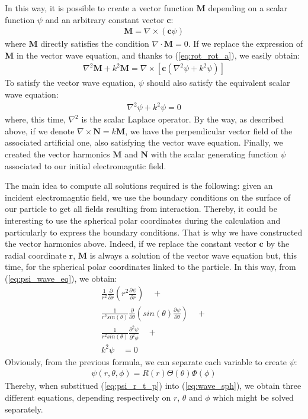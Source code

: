 \documentclass{article}
\begin{document}
In this way, it is possible to create a vector function $\textbf{M}$ depending on a scalar function $\psi$ and an arbitrary constant vector $\textbf{c}$:
\begin{align}
\textbf{M} = \nabla \times (\textbf{c}\psi)
\end{align}
where \textbf{M} directly satisfies the condition $\nabla \cdot \textbf{M} = 0$. If we replace the expression of \textbf{M} in the vector wave equation, and thanks to (\ref{eq:rot_rot_a}), we easily obtain:
\begin{align}
\nabla ^{2} \textbf{M} + k^{2}\textbf{M} = \nabla \times [\textbf{c}(\nabla ^{2} \psi + k^{2}\psi)]
\end{align}
To satisfy the vector wave equation, $\psi$ should also satisfy the equivalent scalar wave equation:
\begin{align}\label{eq:psi_wave_eq}
\nabla ^{2} \psi + k^{2}\psi = 0
\end{align}
where, this time, $\nabla ^{2}$ is the scalar Laplace operator. By the way, as described above, if we denote $\nabla \times \textbf{N} = k \textbf{M}$, we have the perpendicular vector field of the associated artificial one, also satisfying the vector wave equation. Finally, we created the vector harmonics $\textbf{M}$ and $\textbf{N}$ with the scalar generating function $\psi$ associated to our initial electromagntic field.

The main idea to compute all solutions required is the following: given an incident electromagntic field, we use the boundary conditions on the surface of our particle to get all fields resulting from interaction. Thereby, it could be interesting to use the spherical polar coordinates during the calculation and particularly to express the boundary conditions. That is why we have constructed the vector harmonics above. Indeed, if we replace the constant vector $\textbf{c}$ by the radial coordinate $\textbf{r}$, $\textbf{M}$ is always a solution of the vector wave equation but, this time, for the spherical polar coordinates linked to the particle. In this way, from (\ref{eq:psi_wave_eq}), we obtain:
\begin{equation}\label{eq:wave_sph}
\begin{aligned}
\frac{1}{r^{2}}\frac{\partial }{\partial r}(r^{2}\frac{\partial \psi}{\partial r}) \quad + \\ 
\frac{1}{r^{2}sin(\theta)}\frac{\partial }{\partial \theta}(sin(\theta)\frac{\partial \psi}{\partial \theta}) \quad + \\
\frac{1}{r^{2}sin(\theta)}\frac{\partial^{2} \psi}{\partial^{2} \phi} \quad + \\
k^{2}\psi \quad = 0
\end{aligned}
\end{equation}
Obviously, from the previous formula, we can separate each variable to create $\psi$:
\begin{align}\label{eq:psi_r_t_p}
\psi(r, \theta, \phi) = R(r)\Theta(\theta)\Phi(\phi)
\end{align}
Thereby, when substitued (\ref{eq:psi_r_t_p}) into (\ref{eq:wave_sph}), we obtain three different equations, depending respectively on $r$, $\theta$ and $\phi$ which might be solved separately.
\end{document}
